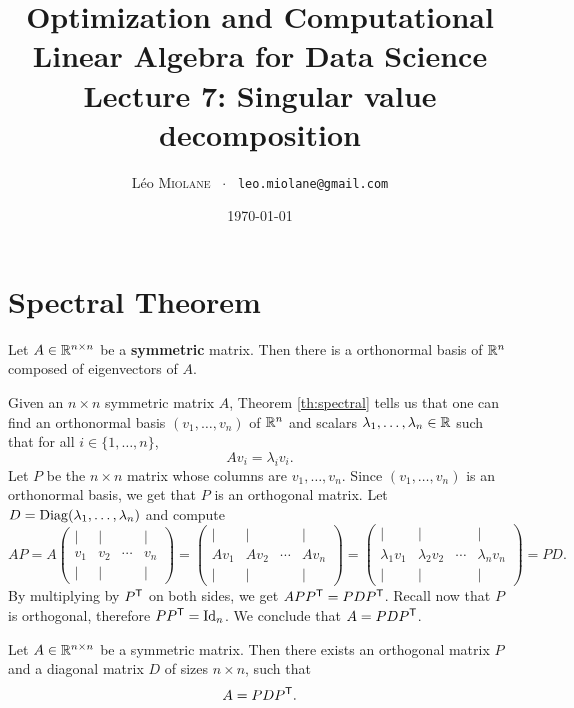 \documentclass[11pt,nocut]{article}
\title{\vspace{-2.0cm}%
	Optimization and Computational Linear Algebra for Data Science\\
Lecture 7: Singular value decomposition}
\author{Léo \textsc{Miolane} \ $\cdot$ \ \texttt{leo.miolane@gmail.com}}
\date{\today}
\begin{document}
\maketitle



\section{Spectral Theorem}



\begin{theorem}\label{th:spectral}
	Let $A \in \mathbb{R}^{n \times n}$ be a \textbf{symmetric} matrix. Then there is a orthonormal basis of $\mathbb{R}^n$ composed of eigenvectors of $A$.
\end{theorem}

Given an $n \times n$ symmetric matrix $A$, Theorem \ref{th:spectral} tells us that one can find an orthonormal basis $(v_1, \dots, v_n)$ of $\mathbb{R}^n$ and scalars $\lambda_1, \dots, \lambda_n \in \mathbb{R}$ such that for all $i \in \{1, \dots, n\}$,
$$
A v_i = \lambda_i v_i.
$$
Let $P$ be the $n \times n$ matrix whose columns are $v_1, \dots, v_n$. Since $(v_1, \dots, v_n)$ is an orthonormal basis, we get that $P$ is an orthogonal matrix. Let $D = {\rm Diag}(\lambda_1, \dots, \lambda_n)$ and compute
$$
A P
= 
A 
\begin{pmatrix}
	| & | & & | \\
	v_1 & v_2 & \cdots& v_n \\
	| & | & & |
\end{pmatrix}
= 
\begin{pmatrix}
	| & | & & | \\
	Av_1 & Av_2 & \cdots& Av_n \\
	| & | & & |
\end{pmatrix}
= 
\begin{pmatrix}
	| & | & & | \\
	\lambda_1 v_1 & \lambda_2 v_2 & \cdots& \lambda_n v_n \\
	| & | & & |
\end{pmatrix}
= P D.
$$
By multiplying by $P^{{\sf T}}$ on both sides, we get $A P P^{{\sf T}} = P D P^{{\sf T}}$. Recall now that $P$ is orthogonal, therefore $P P^{{\sf T}} = {{\rm Id}}_n$. We conclude that $A = P D P^{{\sf T}}$.

\begin{theorem}\label{th:spectral2}
	Let $A \in \mathbb{R}^{n \times n}$ be a symmetric matrix. Then there exists an orthogonal matrix $P$ and a diagonal matrix $D$ of sizes $n \times n$, such that
	$$
	A = P D P^{{\sf T}}.
	$$
\end{theorem}
\end{document}

